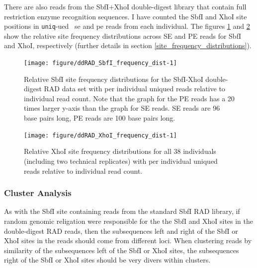 \documentclass[a4paper,12pt,times,print,index,custombib,custommargin]{PhDThesisPSnPDF}\usepackage[]{graphicx}\usepackage[]{color}
\newenvironment{knitrout}{}{} %
\begin{document}
There are also reads from the SbfI$+$XhoI double-digest library that contain full restriction enzyme recognition sequences. I have counted the SbfI and XhoI site positions in \texttt{uniq}-ued  ~\gls{se} and \gls{pe} reads from each individual. The figures \ref{ddRAD_SbfI_frequency_dist} and \ref{ddRAD_XhoI_frequency_dist} show the relative site frequency distributions across SE and PE reads for SbfI and XhoI, respectively (further details in section \ref{site_frequency_distributions}). 
%
\begin{figure}
\begin{knitrout}
\color{fgcolor}

{\centering \texttt{[image: figure/ddRAD\_SbfI\_frequency\_dist-1]} 

}



\end{knitrout}
\caption{Relative SbfI site frequency distributions for the SbfI-XhoI double-digest RAD data set with per individual uniqued reads relative to individual read count. Note that the graph for the PE reads has a 20 times larger y-axis than the graph for SE reads. SE reads are 96 base pairs long, PE reads are 100 base pairs long.}
\label{ddRAD_SbfI_frequency_dist}
\end{figure}
%
%
\begin{figure}
\begin{knitrout}
\color{fgcolor}

{\centering \texttt{[image: figure/ddRAD\_XhoI\_frequency\_dist-1]} 

}



\end{knitrout}
\caption{Relative XhoI site frequency distributions for all 38 individuals (including two technical replicates) with per individual uniqued reads relative to individual read count.}
\label{ddRAD_XhoI_frequency_dist}
\end{figure}
%

\subsubsection{Cluster Analysis}

As with the SbfI site containing reads from the standard SbfI RAD library, if random genomic religation were responsible for the the SbfI and XhoI sites in the double-digest RAD reads, then the subsequences left and right of the SbfI or XhoI sites in the reads should come from different loci. When clustering reads by similarity of the subsequences left of the SbfI or XhoI sites, the subsequences right of the SbfI or XhoI sites should be very divers within clusters.
\end{document}
